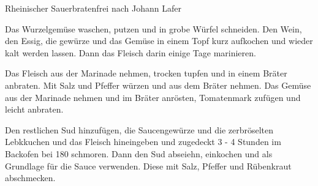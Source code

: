 \begin{recipe}{Rheinischer Sauerbraten}{frei nach Johann Lafer}
  \label{Sauerbraten}


  \steps
  Das Wurzelgemüse waschen, putzen und in grobe Würfel schneiden. Den Wein, den Essig, die
  gewürze und das Gemüse in einem Topf kurz aufkochen und wieder kalt werden lassen. Dann
  das Fleisch darin einige Tage marinieren.

  Das Fleisch aus der Marinade nehmen, trocken tupfen und in einem Bräter anbraten. Mit
  Salz und Pfeffer würzen und aus dem Bräter nehmen. Das Gemüse aus der  Marinade nehmen
  und im Bräter anrösten, Tomatenmark zufügen und leicht anbraten.

  Den restlichen Sud hinzufügen, die Saucengewürze und die zerbröselten Lebkkuchen und das
  Fleisch hineingeben und zugedeckt 3 - 4 Stunden im Backofen bei 180 \celsius schmoren.
  Dann den Sud abseiehn, einkochen und als Grundlage für die Sauce verwenden. Diese mit
  Salz, Pfeffer und Rübenkraut abschmecken.
\end{recipe}
